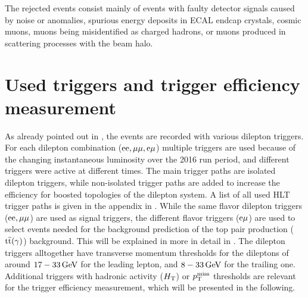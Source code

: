 The rejected events consist mainly of events with faulty detector signals caused by noise or anomalies, spurious energy deposits in ECAL endcap crystals, cosmic muons, muons being misidentified as charged hadrons, or muons produced in scattering processes with the beam halo.


\section{Used triggers and trigger efficiency measurement}\label{sec:triggEff}
As already pointed out in , the events are recorded with various dilepton triggers. For each dilepton combination ($\mathrm{e}\mathrm{e},{\mu}{\mu},\mathrm{e}{\mu}$) multiple triggers are used because of the changing instantaneous luminosity over the 2016 run period, and different triggers were active at different times. The main trigger paths are isolated dilepton triggers, while non-isolated trigger paths are added to increase the efficiency for boosted topologies of the dilepton system. A list of all used HLT trigger paths is given in the appendix in . While the same flavor dilepton triggers ($\mathrm{e}\mathrm{e},{\mu}{\mu}$) are used as signal triggers, the different flavor triggers ($\mathrm{e}{\mu}$) are used to select events needed for the background prediction of the top pair production (${\mathrm{t}\overline{\mathrm{t}}}(\gamma)$) background. This will be explained in more in detail in . The dilepton triggers alltogether have transverse momentum thresholds for the dileptons of around $17-33\,\text{Ge\hspace{-.08em}V}$ for the leading lepton, and $8-33\,\text{Ge\hspace{-.08em}V}$ for the trailing one. Additional triggers with hadronic activity ($H_{\mathrm{T}}$) or $p_{\mathrm{T}}^\text{miss}$ thresholds are relevant for the trigger efficiency measurement, which will be presented in the following.
